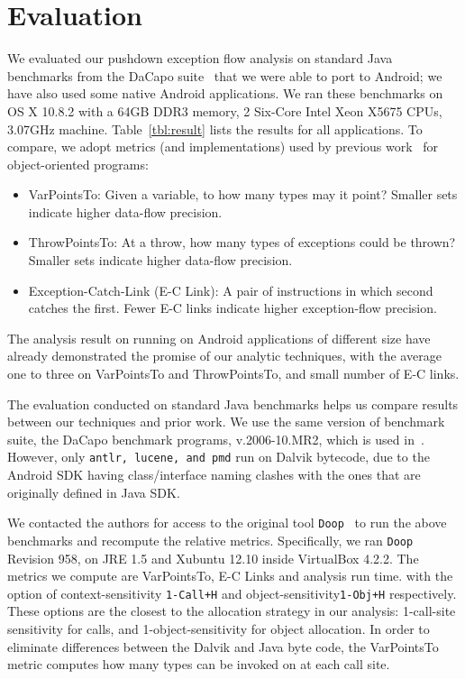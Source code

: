 \section{Evaluation} \label{sec:evaluation} \label{sec:eval}

We evaluated our pushdown exception flow analysis on standard Java
benchmarks from the DaCapo suite~\cite{local:DaCapo:paper} that we
were able to port to Android; we have also used some native Android
applications.
We ran these benchmarks on  
OS X 10.8.2 with a 64GB DDR3 memory,
2 Six-Core Intel Xeon X5675 CPUs, 3.07GHz machine.
Table~\ref{tbl:result} lists the results
for all applications.
To compare, we adopt metrics (and implementations) used by previous work~\cite{Fu:2005:rubust-java-server-apps,Bravenboer:2009:Exceptions}
for object-oriented programs: 
\begin{itemize}
\item VarPointsTo: Given a variable, to how many types may it point?
Smaller sets indicate higher data-flow precision.

\item ThrowPointsTo: At a throw, how many types of exceptions could be thrown?
Smaller sets indicate higher data-flow precision.


\item Exception-Catch-Link (E-C Link): A pair of instructions in which second catches the first.
Fewer E-C links indicate higher exception-flow precision.

\end{itemize}

The analysis result on running on Android applications of different size
have already demonstrated the promise of our analytic techniques, 
with the average one to three on VarPointsTo and ThrowPointsTo, and small 
number of E-C links.

The evaluation conducted on standard Java benchmarks
helps us compare results between our techniques and prior work.
We use the same version of benchmark suite, 
the DaCapo benchmark programs, v.2006-10.MR2,
which is used in~\cite{Bravenboer:2009:Exceptions}.
However, only {\tt{antlr, lucene, and pmd}}
run on Dalvik bytecode,
due to the Android SDK having class/interface naming clashes 
with the ones that are originally defined in Java SDK.

We contacted the authors for access to the original tool {\tt{Doop}}~\cite{Bravenboer:2009:Exceptions} 
to  run  the above benchmarks
and recompute the relative metrics.
Specifically, we ran {\tt{Doop}} Revision 958, on JRE 1.5 and Xubuntu 12.10
inside VirtualBox 4.2.2.
The metrics we compute are VarPointsTo, E-C Links and analysis run time.
with the option of context-sensitivity {\tt{1-Call+H}} and object-sensitivity{\tt{1-Obj+H}} 
respectively.
These options are the closest to the allocation strategy 
in our analysis: 1-call-site sensitivity for calls, and 1-object-sensitivity for object allocation.
In order to eliminate differences 
between the Dalvik and Java byte code,
the VarPointsTo metric computes 
how many types can be invoked on 
at each call site.


